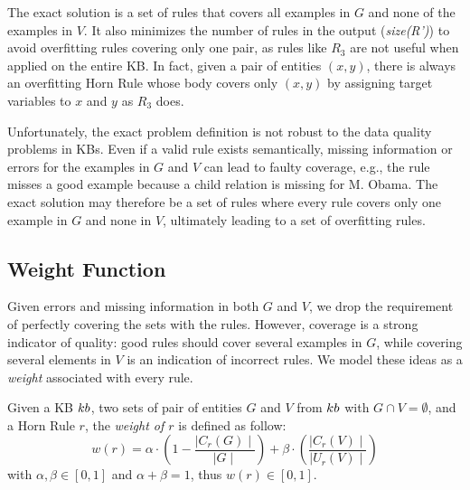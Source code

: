 The exact solution is a set of rules that covers all examples in $G$ and none of the examples in $V$. It also minimizes the number of rules in the output ({\em size(R')}) to avoid overfitting rules covering only one pair, as rules like $R_{3}$ are not useful when applied on the entire KB. In fact, given a pair of entities $(x,y)$, there is always an overfitting Horn Rule whose body covers only $(x,y)$ by assigning target variables to $x$ and $y$ as $R_{3}$ does.

Unfortunately, the exact problem definition is not robust to the %
data quality problems in KBs. Even if a valid rule exists semantically, missing information or errors for the examples in $G$ and $V$ can lead to faulty coverage, e.g., the rule misses a good example because a child relation is missing for M. Obama. %
The exact solution may therefore be a set of rules where every rule covers only one example in $G$ and none in $V$, ultimately leading to a set of overfitting rules.

\vspace{-1ex}	
\subsection{Weight Function} \label{sec:krd_weight_fun}
\vspace{-1ex}	
Given errors and missing information in both $G$ and $V$, we drop the requirement of perfectly covering the sets with the rules. However, coverage is a strong indicator of quality: good rules should cover several examples in $G$, while covering several elements in $V$ is an indication of incorrect rules.
We model these ideas as a \emph{weight} associated with every rule. %


\begin{definition}
	Given a KB ${\sc kb}$, two sets of pair of entities $G$ and $V$ from ${\sc kb}$ with $G \cap V = \emptyset$, and a Horn Rule $r$, the {\em weight of $r$} is defined as follow:
	\begin{equation} \label{eq:weight_fun}
		w(r) = \alpha \cdot (1-\frac{\mid C_{r}(G)\mid}{\mid G \mid}) +\beta \cdot (\frac{\mid C_{r}(V) \mid}{\mid U_{r}(V)\mid})
	\end{equation}
	with $\alpha,\beta \in [0,1]$ and $\alpha + \beta = 1$, thus $w(r) \in [0,1]$. 
\end{definition}

